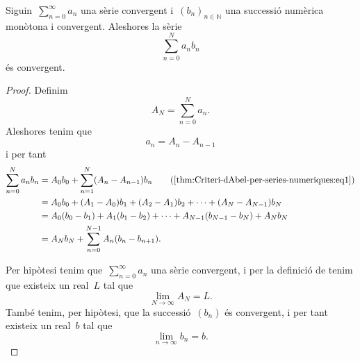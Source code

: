 \documentclass[../analisi-matematica.tex]{subfiles}
\begin{document}
    \begin{theorem}
        \label{thm:Criteri-dAbel-per-series-numeriques}
        Siguin~\(\sum_{n=0}^{\infty}a_{n}\) una sèrie convergent i~\((b_{n})_{n\in\mathbb{N}}\) una successió numèrica monòtona i convergent.
        Aleshores la sèrie
        \[
            \sum_{n=0}^{N}a_{n}b_{n}
        \]
        és convergent.
    \end{theorem}
    \begin{proof}
        Definim
        \[
            A_{N}=\sum_{n=0}^{N}a_{n}.
        \]
        Aleshores tenim que
        \begin{equation}
            \label{thm:Criteri-dAbel-per-series-numeriques:eq1}
            a_{n}=A_{n}-A_{n-1}
        \end{equation}
        i per tant
        \begin{align*}
            \sum_{n=0}^{N}a_{n}b_{n}&=A_{0}b_{0}+\sum_{n=1}^{N}(A_{n}-A_{n-1})b_{n} \tag{\ref{thm:Criteri-dAbel-per-series-numeriques:eq1}}\\
            &=A_{0}b_{0}+(A_{1}-A_{0})b_{1}+(A_{2}-A_{1})b_{2}+\dots+(A_{N}-A_{N-1})b_{N} \\
            &=A_{0}(b_{0}-b_{1})+A_{1}(b_{1}-b_{2})+\dots+A_{N-1}(b_{N-1}-b_{N})+A_{N}b_{N} \\
            &=A_{N}b_{N}+\sum_{n=0}^{N-1}A_{n}(b_{n}-b_{n+1}).
        \end{align*}

        Per hipòtesi tenim que~\(\sum_{n=0}^{\infty}a_{n}\) una sèrie convergent, i per la definició de  tenim que existeix un real~\(L\) tal que
        \begin{equation}
            \label{thm:Criteri-dAbel-per-series-numeriques:eq2}
            \lim_{N\to\infty}A_{N}=L.
        \end{equation}
        També tenim, per hipòtesi, que la successió~\((b_{n})\) és convergent, i per tant existeix un real~\(b\) tal que %
        \begin{equation}
            \label{thm:Criteri-dAbel-per-series-numeriques:eq4}
            \lim_{n\to\infty}b_{n}=b.
        \end{equation}


\end{proof}
\end{document}
